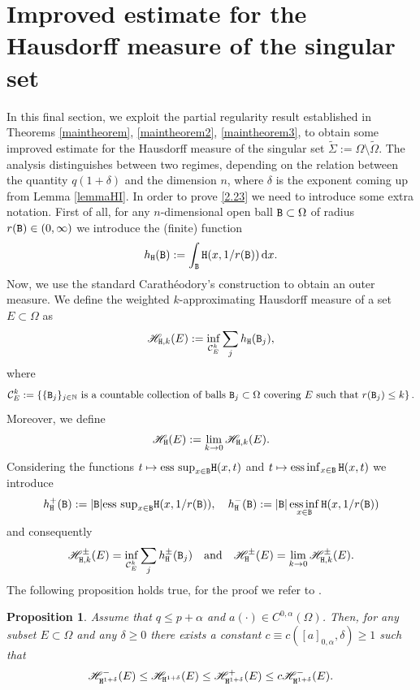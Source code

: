 \documentclass[a4paper]{amsart}
\newtheorem{proposition}[theorem]{Proposition}
\theoremstyle{plain}  %
\numberwithin{equation}{section}
\def\dx{\,{\rm d}x}
\newcommand{\ff}{\tx{H}}
\newcommand{\tx}[1]{\textnormal{\texttt{#1}}}
\DeclareMathOperator*{\essinf}{ess\,inf}
\begin{document}
\section{Improved estimate for the Hausdorff measure of the singular set} \label{sec4}
\noindent
In this final section, we exploit the partial regularity result established in Theorems \ref{maintheorem}, \ref{maintheorem2}, \ref{maintheorem3}, to obtain some improved estimate for the Hausdorff measure of the singular set \( \tilde{\Sigma} := \Omega \setminus \tilde{\Omega} \).
The analysis distinguishes between two regimes, depending on the relation between the quantity \( q(1+\delta) \) and the dimension \( n \), where $\delta$ is the exponent coming up from Lemma \ref{lemmaHI}. In order to prove \eqref{2.23} we need to introduce some extra notation. First of all, for any $n$-dimensional open ball $\tx{B} \subset \Omega$ of radius $r(\tx{B}) \in (0,\infty)$ we introduce the (finite) function
$$ h_\ff(\tx{B}) := \int_{\tx{B}} \ff(x,1/r(\tx{B})) \dx.$$
Now, we use the standard Carathéodory's  construction to obtain an outer measure. We define the weighted $k$-approximating Hausdorff measure of a set $E \subset \Omega$ as
$$ \mathscr{H}_{\ff,k}(E) := \inf_{\mathcal{C}^k_E} \sum_{j} h_{\ff}(\tx{B}_j),$$
where
$$ \mathcal{C}^k_{E} := \left \{ \{ \tx{B}_j\}_{j \in \mathbb{N}} \text{ is a countable collection of balls $\tx{B}_j \subset \Omega$ covering } E \text{ such that } r(\tx{B}_j) \leq k\right \}.$$
Moreover, we define
$$ \mathscr{H}_{\ff}(E) := \lim_{k \to 0} \mathscr{H}_{\ff,k}(E).$$
Considering the functions $t \mapsto \text{ess sup}_{x \in \tx{B}} \ff(x,t)$  and $t \mapsto \essinf_{x \in \tx{B}} \ff(x,t)$ we introduce
$$  h^+_{\ff}(\tx{B}) := |\tx{B}|  \text{ess sup}_{x \in \tx{B}} \ff(x,1/r(\tx{B})), \quad h^-_{\ff}(\tx{B}) := |\tx{B}| \essinf_{x \in \tx{B}} \ff(x,1/r(\tx{B}))$$
and consequently
$$ \mathscr{H}^{\pm}_{\ff,k}(E) = \inf_{\mathcal{C}^k_E}\sum_j h^{\pm}_{\ff}(\tx{B}_j) \quad \text{and} \quad \mathscr{H}_{\ff}^{\pm}(E) = \lim_{k \to 0} \mathscr{H}^{\pm}_{\ff,k}(E).$$
The following proposition holds true, for the proof we refer to \cite[Section 6]{DFM}.
\begin{proposition} \label{prop2} Assume that $q \leq p+\alpha$ and $a(\cdot) \in C^{0,\alpha}(\Omega)$. Then, for any subset $E\subset \Omega$ and any $\delta \geq 0$  there exists a constant $c \equiv c([a]_{0,\alpha},\delta) \geq 1$ such that
    $$ \mathscr{H}^-_{\ff^{1+\delta}}(E) \leq \mathscr{H}_{\ff^{1+\delta}}(E) \leq \mathscr{H}^+_{\ff^{1+\delta}}(E) \leq c \mathscr{H}^-_{\ff^{1+\delta}}(E).$$
\end{proposition}
\end{document}
